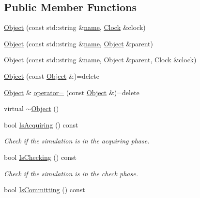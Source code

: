 \subsection*{Public Member Functions}
\begin{DoxyCompactItemize}
\item 
\hyperlink{class_simulator_1_1_object_a009dfade33295cace40b14804a0482c3}{Object} (const std\+::string \&\hyperlink{mtconf_8c_a8f8f80d37794cde9472343e4487ba3eb}{name}, \hyperlink{class_simulator_1_1_clock}{Clock} \&clock)
\item 
\hyperlink{class_simulator_1_1_object_a2023b11c0ee85dcb853ce468a85b0376}{Object} (const std\+::string \&\hyperlink{mtconf_8c_a8f8f80d37794cde9472343e4487ba3eb}{name}, \hyperlink{class_simulator_1_1_object}{Object} \&parent)
\item 
\hyperlink{class_simulator_1_1_object_ad1cb2cd87d87a56a9580de5d09bf09ae}{Object} (const std\+::string \&\hyperlink{mtconf_8c_a8f8f80d37794cde9472343e4487ba3eb}{name}, \hyperlink{class_simulator_1_1_object}{Object} \&parent, \hyperlink{class_simulator_1_1_clock}{Clock} \&clock)
\item 
\hyperlink{class_simulator_1_1_object_ae3fe229daf6331cb57b533904f266b41}{Object} (const \hyperlink{class_simulator_1_1_object}{Object} \&)=delete
\item 
\hyperlink{class_simulator_1_1_object}{Object} \& \hyperlink{class_simulator_1_1_object_a05ffed88196336cba02905e54f7fd234}{operator=} (const \hyperlink{class_simulator_1_1_object}{Object} \&)=delete
\item 
virtual \hyperlink{class_simulator_1_1_object_ac887c0b3c7e1727483f9ee09d6bbb82d}{$\sim$\+Object} ()
\item 
bool \hyperlink{class_simulator_1_1_object_ae39d11e662626e7f8b78ece1e6a004d7}{Is\+Acquiring} () const 
\begin{DoxyCompactList}\small\item\em Check if the simulation is in the acquiring phase. \end{DoxyCompactList}\item 
bool \hyperlink{class_simulator_1_1_object_a5e4613433310b3acdfcbc91d23800b9d}{Is\+Checking} () const 
\begin{DoxyCompactList}\small\item\em Check if the simulation is in the check phase. \end{DoxyCompactList}\item 
bool \hyperlink{class_simulator_1_1_object_a70edbded852cff77aad640b08e7c2df2}{Is\+Committing} () const 

\end{DoxyCompactItemize}
